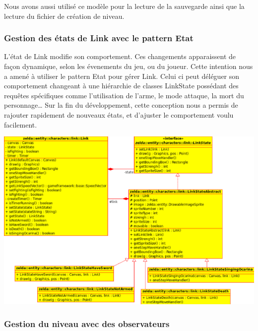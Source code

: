 \documentclass[a4paper,11pt]{article}
\begin{document}
\begin{center}
\end{center}

Nous avons aussi utilis\'e ce mod\`ele pour la lecture de la sauvegarde
ainsi que la lecture du fichier de cr\'eation de niveau.

\subsubsection*{Gestion des \'etats de Link avec le pattern Etat}
L'\'etat de Link modifie son comportement. Ces changements
apparaissent de façon dynamique, selon les \'evenements du jeu, ou du joueur.
Cette intention nous a amen\'e \`a utiliser le pattern Etat pour g\'erer Link. Celui
ci peut d\'el\'eguer son comportement changeant \`a une hi\'erarchie de classes
LinkState poss\'edant des requ\^etes sp\'ecifiques comme l'utilisation de l'arme, le
mode attaque, la mort du personnage\ldots
Sur la fin du d\'eveloppement, cette conception nous a permis de rajouter
rapidement de nouveaux \'etats, et d'ajuster le comportement voulu facilement. \\

\begin{center}
 \includegraphics[scale=0.8]{images/Statediagram.eps}
\end{center}
 
\subsubsection*{Gestion du niveau avec des observateurs}
 
\end{document}
